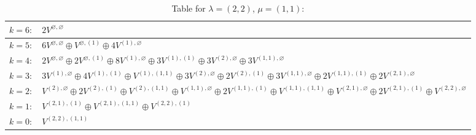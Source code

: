 \renewcommand{\arraystretch}{1.6} 
\begin{table}[H]
\centering
\caption{Table for $\lambda = (2, 2)$, $\mu = (1, 1)$:}
\begin{tabular}{|>{\centering\arraybackslash}p{15cm}|}
\hline
 $k = 6: \quad 2 V^{\varnothing, \varnothing} $ \\ \hline
 $k = 5: \quad 6 V^{\varnothing, \varnothing} \oplus V^{\varnothing, (1)} \oplus 4 V^{(1), \varnothing} $ \\ \hline
 $k = 4: \quad 2 V^{\varnothing, \varnothing} \oplus 2 V^{\varnothing, (1)} \oplus 8 V^{(1), \varnothing} \oplus 3 V^{(1), (1)} \oplus 3 V^{(2), \varnothing} \oplus 3 V^{(1, 1), \varnothing} $ \\ \hline
 $k = 3: \quad 3 V^{(1), \varnothing} \oplus 4 V^{(1), (1)} \oplus V^{(1), (1, 1)} \oplus 3 V^{(2), \varnothing} \oplus 2 V^{(2), (1)} \oplus 3 V^{(1, 1), \varnothing} \oplus 2 V^{(1, 1), (1)} \oplus 2 V^{(2, 1), \varnothing} $ \\ \hline
 $k = 2: \quad V^{(2), \varnothing} \oplus 2 V^{(2), (1)} \oplus V^{(2), (1, 1)} \oplus V^{(1, 1), \varnothing} \oplus 2 V^{(1, 1), (1)} \oplus V^{(1, 1), (1, 1)} \oplus V^{(2, 1), \varnothing} \oplus 2 V^{(2, 1), (1)} \oplus V^{(2, 2), \varnothing} $ \\ \hline
 $k = 1: \quad V^{(2, 1), (1)} \oplus V^{(2, 1), (1, 1)} \oplus V^{(2, 2), (1)} $ \\ \hline
 $k = 0: \quad V^{(2, 2), (1, 1)} $ \\ \hline
\end{tabular}
\end{table}


